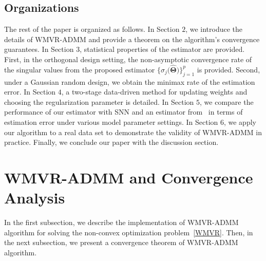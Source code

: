 \documentclass[alpha-refs]{wiley-article}
\begin{document}
\subsection{Organizations}
The rest of the paper is organized as follows.
In Section $2$, we introduce the details of WMVR-ADMM and provide a theorem on the algorithm's convergence guarantees.
In Section $3$, statistical properties of the estimator are provided.
First, in the orthogonal design setting, the non-asymptotic convergence rate of the singular values from the proposed estimator  $\{\sigma_{j}\big(\widehat{\boldsymbol{\Theta}}\big)\}_{j=1}^{p}$ is provided.
Second, under a Gaussian random design, we obtain the minimax rate of the estimation error.
In Section $4$, a two-stage data-driven method for updating weights and choosing the regularization parameter is detailed.
In Section $5$, we compare the performance of our estimator with SNN and an estimator from~\citet{chen2013reduced} in terms of estimation error under various model parameter settings.
In Section $6$, we apply our algorithm to a real data set to demonstrate the validity of WMVR-ADMM in practice.
Finally, we conclude our paper with the discussion section.

\section{WMVR-ADMM and Convergence Analysis}
In the first subsection, we describe the implementation of WMVR-ADMM algorithm for solving the non-convex optimization  problem~\eqref{WMVR}.
Then, in the next subsection, we present a convergence theorem of WMVR-ADMM algorithm.
\end{document}
